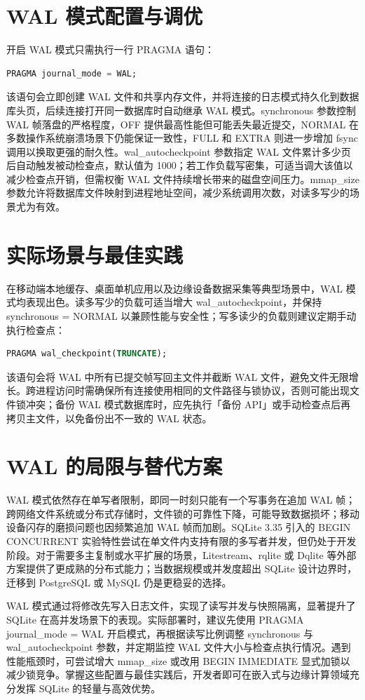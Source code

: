 \chapter{WAL 模式配置与调优}
开启 WAL 模式只需执行一行 PRAGMA 语句：\par
\begin{lstlisting}[language=sql]
PRAGMA journal_mode = WAL;
\end{lstlisting}
该语句会立即创建 WAL 文件和共享内存文件，并将连接的日志模式持久化到数据库头页，后续连接打开同一数据库时自动继承 WAL 模式。synchronous 参数控制 WAL 帧落盘的严格程度，OFF 提供最高性能但可能丢失最近提交，NORMAL 在多数操作系统崩溃场景下仍能保证一致性，FULL 和 EXTRA 则进一步增加 fsync 调用以换取更强的耐久性。wal\_{}autocheckpoint 参数指定 WAL 文件累计多少页后自动触发被动检查点，默认值为 1000；若工作负载写密集，可适当调大该值以减少检查点开销，但需权衡 WAL 文件持续增长带来的磁盘空间压力。mmap\_{}size 参数允许将数据库文件映射到进程地址空间，减少系统调用次数，对读多写少的场景尤为有效。\par
\chapter{实际场景与最佳实践}
在移动端本地缓存、桌面单机应用以及边缘设备数据采集等典型场景中，WAL 模式均表现出色。读多写少的负载可适当增大 wal\_{}autocheckpoint，并保持 synchronous = NORMAL 以兼顾性能与安全性；写多读少的负载则建议定期手动执行检查点：\par
\begin{lstlisting}[language=sql]
PRAGMA wal_checkpoint(TRUNCATE);
\end{lstlisting}
该语句会将 WAL 中所有已提交帧写回主文件并截断 WAL 文件，避免文件无限增长。跨进程访问时需确保所有连接使用相同的文件路径与锁协议，否则可能出现文件锁冲突；备份 WAL 模式数据库时，应先执行「备份 API」或手动检查点后再拷贝主文件，以免备份出不一致的 WAL 状态。\par
\chapter{WAL 的局限与替代方案}
WAL 模式依然存在单写者限制，即同一时刻只能有一个写事务在追加 WAL 帧；跨网络文件系统或分布式存储时，文件锁的可靠性下降，可能导致数据损坏；移动设备闪存的磨损问题也因频繁追加 WAL 帧而加剧。SQLite 3.35 引入的 BEGIN CONCURRENT 实验特性尝试在单文件内支持有限的多写者并发，但仍处于开发阶段。对于需要多主复制或水平扩展的场景，Litestream、rqlite 或 Dqlite 等外部方案提供了更成熟的分布式能力；当数据规模或并发度超出 SQLite 设计边界时，迁移到 PostgreSQL 或 MySQL 仍是更稳妥的选择。\par
WAL 模式通过将修改先写入日志文件，实现了读写并发与快照隔离，显著提升了 SQLite 在高并发场景下的表现。实际部署时，建议先使用 PRAGMA journal\_{}mode = WAL 开启模式，再根据读写比例调整 synchronous 与 wal\_{}autocheckpoint 参数，并定期监控 WAL 文件大小与检查点执行情况。遇到性能瓶颈时，可尝试增大 mmap\_{}size 或改用 BEGIN IMMEDIATE 显式加锁以减少锁竞争。掌握这些配置与最佳实践后，开发者即可在嵌入式与边缘计算领域充分发挥 SQLite 的轻量与高效优势。\par
